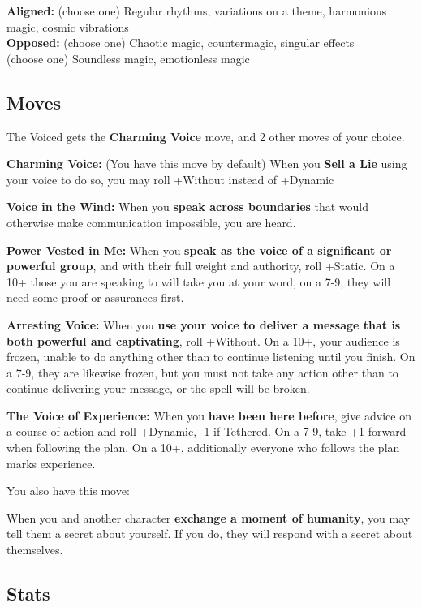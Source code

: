 \documentclass[
  oneside,
  statementpaper,
  9pt]{memoir}
\begin{document}
\textbf{Aligned:} (choose one) Regular rhythms, variations on a theme,
harmonious magic, cosmic vibrations\\
\textbf{Opposed:} (choose one) Chaotic magic, countermagic, singular
effects\\
(choose one) Soundless magic, emotionless magic

\hypertarget{moves-7}{%
\subsection{Moves}\label{moves-7}}

The Voiced gets the \textbf{Charming Voice} move, and 2 other moves of
your choice.

\textbf{Charming Voice:} (You have this move by default) When you
\textbf{Sell a Lie} using your voice to do so, you may roll +Without
instead of +Dynamic

\textbf{Voice in the Wind:} When you \textbf{speak across boundaries}
that would otherwise make communication impossible, you are heard.

\textbf{Power Vested in Me:} When you \textbf{speak as the voice of a
significant or powerful group}, and with their full weight and
authority, roll +Static. On a 10+ those you are speaking to will take
you at your word, on a 7-9, they will need some proof or assurances
first.

\textbf{Arresting Voice:} When you \textbf{use your voice to deliver a
message that is both powerful and captivating}, roll +Without. On a 10+,
your audience is frozen, unable to do anything other than to continue
listening until you finish. On a 7-9, they are likewise frozen, but you
must not take any action other than to continue delivering your message,
or the spell will be broken.

\textbf{The Voice of Experience:} When you \textbf{have been here
before}, give advice on a course of action and roll +Dynamic, -1 if
Tethered. On a 7-9, take +1 forward when following the plan. On a 10+,
additionally everyone who follows the plan marks experience.

You also have this move:

When you and another character \textbf{exchange a moment of humanity},
you may tell them a secret about yourself. If you do, they will respond
with a secret about themselves.

\hypertarget{stats-8}{%
\subsection{Stats}\label{stats-8}}
\end{document}
